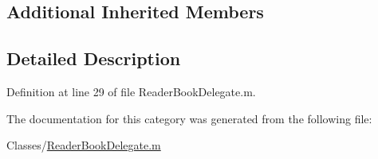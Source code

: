 \subsection*{Additional Inherited Members}


\subsection{Detailed Description}


Definition at line 29 of file Reader\-Book\-Delegate.\-m.



The documentation for this category was generated from the following file\-:\begin{DoxyCompactItemize}
\item 
Classes/\hyperlink{_reader_book_delegate_8m}{Reader\-Book\-Delegate.\-m}\end{DoxyCompactItemize}
